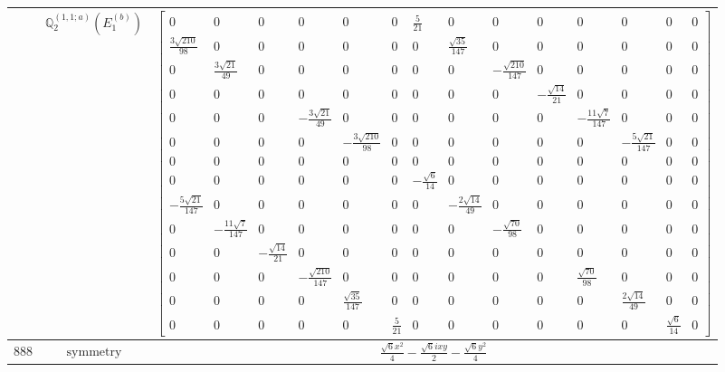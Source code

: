 \documentclass[fleqn,8pt,landscape]{jsarticle}
\begin{document}
\begin{longtable}{ccc}
$  $ & $ \mathbb{Q}_{2}^{(1,1;a)}(E_{1}^{(b)}) $ & $ \begin{bmatrix} 0 & 0 & 0 & 0 & 0 & 0 & \frac{5}{21} & 0 & 0 & 0 & 0 & 0 & 0 & 0 \\ \frac{3 \sqrt{210}}{98} & 0 & 0 & 0 & 0 & 0 & 0 & \frac{\sqrt{35}}{147} & 0 & 0 & 0 & 0 & 0 & 0 \\ 0 & \frac{3 \sqrt{21}}{49} & 0 & 0 & 0 & 0 & 0 & 0 & - \frac{\sqrt{210}}{147} & 0 & 0 & 0 & 0 & 0 \\ 0 & 0 & 0 & 0 & 0 & 0 & 0 & 0 & 0 & - \frac{\sqrt{14}}{21} & 0 & 0 & 0 & 0 \\ 0 & 0 & 0 & - \frac{3 \sqrt{21}}{49} & 0 & 0 & 0 & 0 & 0 & 0 & - \frac{11 \sqrt{7}}{147} & 0 & 0 & 0 \\ 0 & 0 & 0 & 0 & - \frac{3 \sqrt{210}}{98} & 0 & 0 & 0 & 0 & 0 & 0 & - \frac{5 \sqrt{21}}{147} & 0 & 0 \\ 0 & 0 & 0 & 0 & 0 & 0 & 0 & 0 & 0 & 0 & 0 & 0 & 0 & 0 \\ 0 & 0 & 0 & 0 & 0 & 0 & - \frac{\sqrt{6}}{14} & 0 & 0 & 0 & 0 & 0 & 0 & 0 \\ - \frac{5 \sqrt{21}}{147} & 0 & 0 & 0 & 0 & 0 & 0 & - \frac{2 \sqrt{14}}{49} & 0 & 0 & 0 & 0 & 0 & 0 \\ 0 & - \frac{11 \sqrt{7}}{147} & 0 & 0 & 0 & 0 & 0 & 0 & - \frac{\sqrt{70}}{98} & 0 & 0 & 0 & 0 & 0 \\ 0 & 0 & - \frac{\sqrt{14}}{21} & 0 & 0 & 0 & 0 & 0 & 0 & 0 & 0 & 0 & 0 & 0 \\ 0 & 0 & 0 & - \frac{\sqrt{210}}{147} & 0 & 0 & 0 & 0 & 0 & 0 & \frac{\sqrt{70}}{98} & 0 & 0 & 0 \\ 0 & 0 & 0 & 0 & \frac{\sqrt{35}}{147} & 0 & 0 & 0 & 0 & 0 & 0 & \frac{2 \sqrt{14}}{49} & 0 & 0 \\ 0 & 0 & 0 & 0 & 0 & \frac{5}{21} & 0 & 0 & 0 & 0 & 0 & 0 & \frac{\sqrt{6}}{14} & 0 \end{bmatrix} $ \\ \hline
$ 888 $ & $ \text{symmetry} $ & $ \frac{\sqrt{6} x^{2}}{4} - \frac{\sqrt{6} i x y}{2} - \frac{\sqrt{6} y^{2}}{4} $ \\

\end{longtable}
\end{document}
